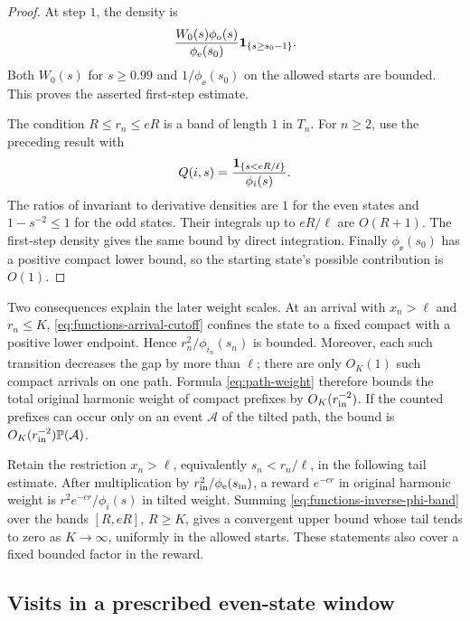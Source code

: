 \begin{proof}
At step \(1\), the density is
\[
 \frac{W_0(s)\phi_\mathrm o(s)}{\phi_\mathrm e(s_0)}
 \mathbf 1_{\{s\ge s_0-1\}}.
\]
Both \(W_0(s)\) for \(s\ge0.99\) and
\(1/\phi_\ee(s_0)\) on the allowed starts are bounded.
This proves the asserted first-step estimate.

The condition \(R\le r_n\le eR\) is a band of length \(1\) in
\(T_n\).  For \(n\ge2\), use the preceding result with
\[
 Q(i,s)=\frac{\mathbf 1_{\{s<eR/\ell\}}}{\phi_i(s)}.
\]
The ratios of invariant to derivative densities are \(1\) for
the even states and \(1-s^{-2}\le1\) for the odd states.
Their integrals up to \(eR/\ell\) are \(O(R+1)\).
The first-step density gives the same bound by direct integration.
Finally \(\phi_\ee(s_0)\) has a positive compact lower bound, so
the starting state's possible contribution is \(O(1)\).
\end{proof}

\begin{remark}\label{rem:functions-compact-weight}
Two consequences explain the later weight scales.
At an arrival with \(x_n>\ell\) and \(r_n\le K\),
\eqref{eq:functions-arrival-cutoff} confines the state to a
fixed compact with a positive lower endpoint.  Hence
\(r_n^2/\phi_{i_n}(s_n)\) is bounded.
Moreover, each such transition decreases the gap by more than
\(\ell\); there are only \(O_K(1)\) such compact arrivals on
one path.  Formula \eqref{eq:path-weight} therefore bounds the
total original harmonic weight of compact prefixes by
\(O_K(r_{\rm in}^{-2})\).
If the counted prefixes can occur only on an event \(\mathcal A\)
of the tilted path, the bound is
\(O_K(r_{\rm in}^{-2})\mathbb P(\mathcal A)\).

Retain the restriction \(x_n>\ell\), equivalently
\(s_n<r_n/\ell\), in the following tail estimate.
After multiplication by
\(r_{\rm in}^2/\phi_\mathrm e(s_{\rm in})\), a reward \(e^{-c r}\)
in original harmonic weight is \(r^2e^{-c r}/\phi_i(s)\)
in tilted weight.  Summing
\eqref{eq:functions-inverse-phi-band} over the bands
\([R,eR]\), \(R\ge K\), gives a convergent upper bound whose
tail tends to zero as \(K\to\infty\), uniformly in the allowed
starts.  These statements also cover a fixed bounded factor
in the reward.
\end{remark}

\subsection{Visits in a prescribed even-state window}

